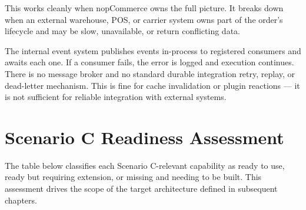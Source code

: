 This works cleanly when nopCommerce owns the full picture. It breaks down when an external
warehouse, POS, or carrier system owns part of the order's lifecycle and may be slow,
unavailable, or return conflicting data.

The internal event system publishes events in-process to registered consumers and awaits each
one. If a consumer fails, the error is logged and execution continues. There is no message
broker and no standard durable integration retry, replay, or dead-letter mechanism. This is
fine for cache invalidation or plugin reactions --- it is not sufficient for reliable
integration with external systems.

\section{Scenario C Readiness Assessment}

The table below classifies each Scenario C-relevant capability as ready to use, ready but
requiring extension, or missing and needing to be built. This assessment drives the scope of
the target architecture defined in subsequent chapters.

